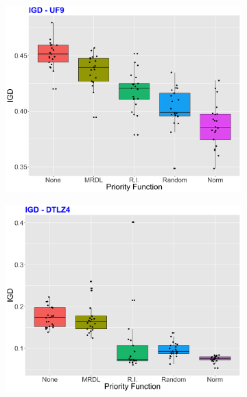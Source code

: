 \begin{figure}[!t]

	\begin{subfigure}[b]{0.33\textwidth}
		\centering
		\includegraphics[width=1\textwidth, height=1\textwidth]{images/UF9_IGD.png}
	\end{subfigure}
	\begin{subfigure}[b]{0.33\textwidth}
		\centering
		\includegraphics[width=1\textwidth, height=1\textwidth]{images/DTLZ4_IGD.png}

\end{subfigure}
\end{figure}
